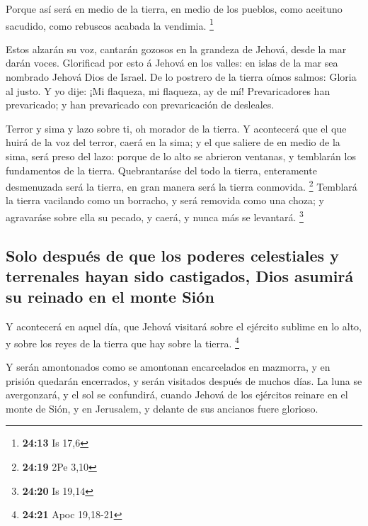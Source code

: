  Porque así será en medio de la tierra, en medio de los
pueblos, como aceituno sacudido, como rebuscos acabada la vendimia.
\footnote{\textbf{24:13} Is 17,6}

 Estos alzarán su voz, cantarán gozosos en la grandeza de
Jehová, desde la mar darán voces.  Glorificad por esto á
Jehová en los valles: en islas de la mar sea nombrado Jehová Dios de
Israel.  De lo postrero de la tierra oímos salmos: Gloria
al justo. Y yo dije: ¡Mi flaqueza, mi flaqueza, ay de mí! Prevaricadores
han prevaricado; y han prevaricado con prevaricación de desleales.

 Terror y sima y lazo sobre ti, oh morador de la tierra.
 Y acontecerá que el que huirá de la voz del terror, caerá
en la sima; y el que saliere de en medio de la sima, será preso del
lazo: porque de lo alto se abrieron ventanas, y temblarán los
fundamentos de la tierra.  Quebrantaráse del todo la
tierra, enteramente desmenuzada será la tierra, en gran manera será la
tierra conmovida. \footnote{\textbf{24:19} 2Pe 3,10} 
Temblará la tierra vacilando como un borracho, y será removida como una
choza; y agravaráse sobre ella su pecado, y caerá, y nunca más se
levantará. \footnote{\textbf{24:20} Is 19,14}

\hypertarget{solo-despuuxe9s-de-que-los-poderes-celestiales-y-terrenales-hayan-sido-castigados-dios-asumiruxe1-su-reinado-en-el-monte-siuxf3n}{%
\subsection{Solo después de que los poderes celestiales y terrenales
hayan sido castigados, Dios asumirá su reinado en el monte
Sión}\label{solo-despuuxe9s-de-que-los-poderes-celestiales-y-terrenales-hayan-sido-castigados-dios-asumiruxe1-su-reinado-en-el-monte-siuxf3n}}

 Y acontecerá en aquel día, que Jehová visitará sobre el
ejército sublime en lo alto, y sobre los reyes de la tierra que hay
sobre la tierra. \footnote{\textbf{24:21} Apoc 19,18-21}

 Y serán amontonados como se amontonan encarcelados en
mazmorra, y en prisión quedarán encerrados, y serán visitados después de
muchos días.  La luna se avergonzará, y el sol se
confundirá, cuando Jehová de los ejércitos reinare en el monte de Sión,
y en Jerusalem, y delante de sus ancianos fuere glorioso.

